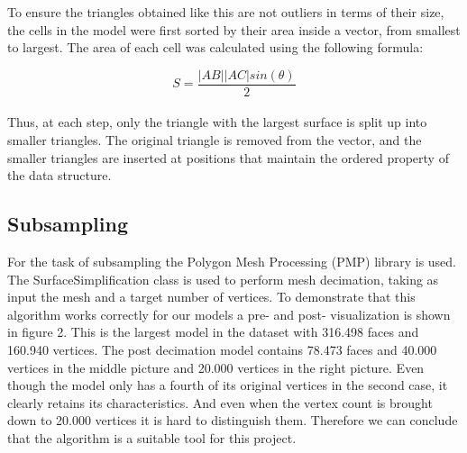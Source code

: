 \documentclass{bigdata}
\begin{document}
\noindent To ensure the triangles obtained like this are not outliers in terms of their size, the cells in the model were first sorted by their area inside a vector, from smallest to largest. The area of each cell was calculated using the following formula:

\begin{equation}
S = \frac{|AB||AC|sin(\theta)}{2}
\end{equation}\\

\noindent Thus, at each step, only the triangle with the largest surface is split up into smaller triangles. The original triangle is removed from the vector, and the smaller triangles are inserted at positions that maintain the ordered property of the data structure.

\subsection{Subsampling}
For the task of subsampling the Polygon Mesh Processing (PMP) library is used. The SurfaceSimplification class is used to perform mesh decimation, taking as input the mesh and a target number of vertices. To demonstrate that this algorithm works correctly for our models a pre- and post- visualization is shown in figure 2. This is the largest model in the dataset with 316.498 faces and 160.940 vertices. The post decimation model contains 78.473 faces and 40.000 vertices in the middle picture and 20.000 vertices in the right picture. Even though the model only has a fourth of its original vertices in the second case, it clearly retains its characteristics. And even when the vertex count is brought down to 20.000 vertices it is hard to distinguish them. Therefore we can conclude that the algorithm is a suitable tool for this project.
\end{document}
